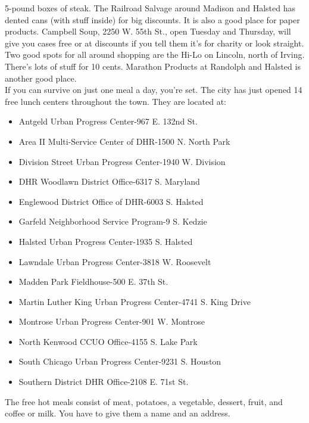 \documentclass[11pt,twoside,a4paper]{book}
\begin{document}
5-pound boxes of steak. The Railroad Salvage around Madison and Halsted has dented cans (with stuff inside) for big discounts. It is also a good place for paper products. Campbell Soup, 2250 W. 55th St., open Tuesday and Thursday, will give you cases free or at discounts if you tell them it's for charity or look straight. Two good spots for all around shopping are the Hi-Lo on Lincoln, north of Irving. There's lots of stuff for 10 cents. Marathon Products at Randolph and Halsted is another good place.~\\

If you can survive on just one meal a day, you're set. The city has just opened 14 free lunch centers throughout the town. They are located at: 
\begin{itemize}
\item Antgeld Urban Progress Center-967 E. 132nd St. 
\item Area II Multi-Service Center of DHR-1500 N. North Park 
\item Division Street Urban Progress Center-1940 W. Division 
\item DHR Woodlawn District Office-6317 S. Maryland 
\item Englewood District Office of DHR-6003 S. Halsted 
\item Garfeld Neighborhood Service Program-9 S. Kedzie 
\item Halsted Urban Progress Center-1935 S. Halsted 
\item Lawndale Urban Progress Center-3818 W. Roosevelt 
\item Madden Park Fieldhouse-500 E. 37th St. 
\item Martin Luther King Urban Progress Center-4741 S. King Drive 
\item Montrose Urban Progress Center-901 W. Montrose 
\item North Kenwood CCUO Office-4155 S. Lake Park 
\item South Chicago Urban Progress Center-9231 S. Houston 
\item Southern District DHR Office-2108 E. 71st St.
\end{itemize}
The free hot meals consist of meat, potatoes, a vegetable, dessert, fruit, and coffee or milk. You have to give them a name and an address.~\\
\end{document}
